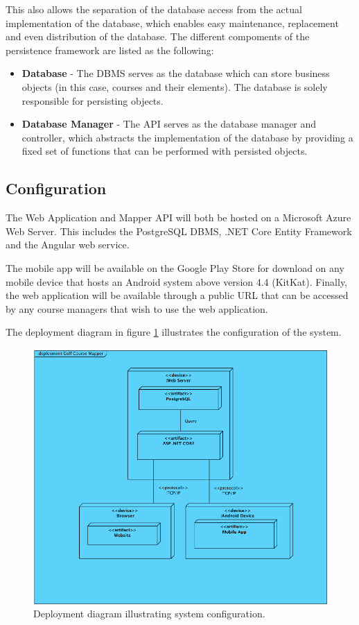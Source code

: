 \documentclass{article}
\begin{document}
    This also allows the separation of the database access from the actual
    implementation of the database, which enables easy maintenance, replacement
    and even distribution of the database. The different compoments of the
    persistence framework are listed as the following:

    \begin{itemize}
        \item \textbf{Database} - The DBMS serves as the database which can
            store business objects (in this case, courses and their elements).
            The database is solely responsible for persisting objects.
        \item \textbf{Database Manager} - The API serves as the database
            manager and controller, which abstracts the implementation of the
            database by providing a fixed set of functions that can be
            performed with persisted objects.
    \end{itemize}

    \subsection{Configuration}

    The Web Application and Mapper API will both be hosted on a Microsoft Azure
    Web Server. This includes the PostgreSQL DBMS, .NET Core Entity Framework
    and the Angular web service.

    The mobile app will be available on the Google Play Store for download on
    any mobile device that hosts an Android system above version 4.4 (KitKat).
    Finally, the web application will be available through a public URL that
    can be accessed by any course managers that wish to use the web
    application.

    The deployment diagram in figure \ref{fig:depdia} illustrates the
    configuration of the system.

    \begin{center}
        \begin{figure}[h!]
            \centering
            \includegraphics[scale=0.9]{DeploymentDiagram}
            \caption{Deployment diagram illustrating system configuration.}
            \label{fig:depdia}
        \end{figure}
    \end{center}
\end{document}
